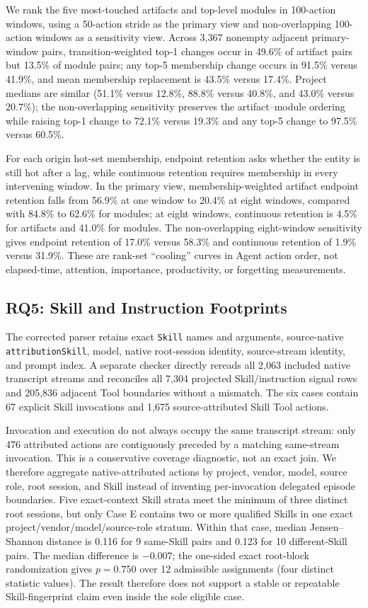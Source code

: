\documentclass[letterpaper]{article}
\begin{document}
We rank the five most-touched artifacts and top-level modules in 100-action
windows, using a 50-action stride as the primary view and non-overlapping
100-action windows as a sensitivity view.  Across 3,367 nonempty adjacent
primary-window pairs, transition-weighted top-1 changes occur in 49.6\% of
artifact pairs but 13.5\% of module pairs; any top-5 membership change occurs
in 91.5\% versus 41.9\%, and mean membership replacement is 43.5\% versus
17.4\%.  Project medians are similar (51.1\% versus 12.8\%, 88.8\% versus
40.8\%, and 43.0\% versus 20.7\%); the non-overlapping sensitivity preserves
the artifact--module ordering while raising top-1 change to 72.1\% versus
19.3\% and any top-5 change to 97.5\% versus 60.5\%.

For each origin hot-set membership, endpoint retention asks whether the entity
is still hot after a lag, while continuous retention requires membership in
every intervening window.  In the primary view, membership-weighted artifact
endpoint retention falls from 56.9\% at one window to 20.4\% at eight windows,
compared with 84.8\% to 62.6\% for modules; at eight windows, continuous
retention is 4.5\% for artifacts and 41.0\% for modules.  The non-overlapping
eight-window sensitivity gives endpoint retention of 17.0\% versus 58.3\% and
continuous retention of 1.9\% versus 31.9\%.  These are rank-set ``cooling''
curves in Agent action order, not elapsed-time, attention, importance,
productivity, or forgetting measurements.

\subsection{RQ5: Skill and Instruction Footprints}

The corrected parser retains exact \texttt{Skill} names and arguments,
source-native \texttt{attributionSkill}, model, native root-session identity,
source-stream identity, and prompt index.  A separate checker directly rereads
all 2,063 included native transcript streams and reconciles all 7,304 projected
Skill/instruction signal rows and 205,836 adjacent Tool boundaries without a
mismatch.  The six
cases contain 67 explicit Skill invocations and 1,675 source-attributed Skill
Tool actions.

Invocation and execution do not always occupy the same transcript stream: only
476 attributed actions are contiguously preceded by a matching same-stream
invocation.  This is a conservative coverage diagnostic, not an exact join.
We therefore aggregate native-attributed actions by project, vendor, model,
source role, root session, and Skill instead of inventing per-invocation
delegated episode boundaries. Five exact-context Skill strata meet the minimum
of three distinct root sessions, but only
Case E contains two or more qualified Skills in one
exact project/vendor/model/source-role stratum. Within that case, median
Jensen--Shannon distance is 0.116 for 9 same-Skill pairs and 0.123 for 10
different-Skill pairs.  The median difference is $-0.007$; the one-sided exact
root-block randomization gives $p=0.750$ over 12 admissible assignments (four
distinct statistic values).  The result therefore does not support
a stable or repeatable Skill-fingerprint claim even inside the sole eligible
case.
\end{document}
